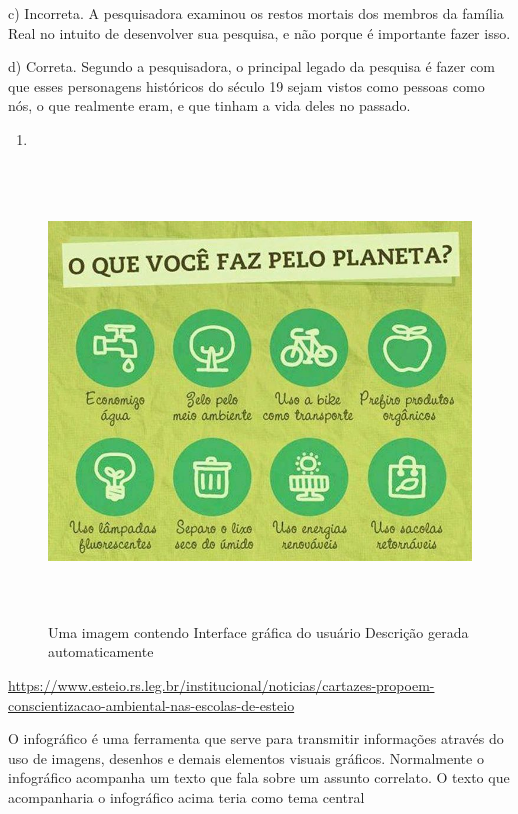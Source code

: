 {c) Incorreta. A pesquisadora examinou os restos mortais dos membros da
família Real no intuito de desenvolver sua pesquisa, e não porque é
importante fazer isso.

d) Correta. Segundo a pesquisadora, o principal legado da pesquisa é
fazer com que esses personagens históricos do século 19 sejam vistos
como pessoas como nós, o que realmente eram, e que tinham a vida deles
no passado.

\begin{enumerate}
\def\labelenumi{\arabic{enumi}.}
\setcounter{enumi}{14}
\tightlist
\item
\end{enumerate}

\begin{figure}
\centering
\includegraphics[width=5.90556in,height=4.73611in]{./imgSAEB_6_POR/media/image37.png}
\caption{Uma imagem contendo Interface gráfica do usuário Descrição
gerada automaticamente}
\end{figure}

\url{https://www.esteio.rs.leg.br/institucional/noticias/cartazes-propoem-conscientizacao-ambiental-nas-escolas-de-esteio}

O infográfico é uma ferramenta que serve para transmitir informações
através do uso de imagens, desenhos e demais elementos visuais gráficos.
Normalmente o infográfico acompanha um texto que fala sobre um assunto
correlato. O texto que acompanharia o infográfico acima teria como tema
central

}
